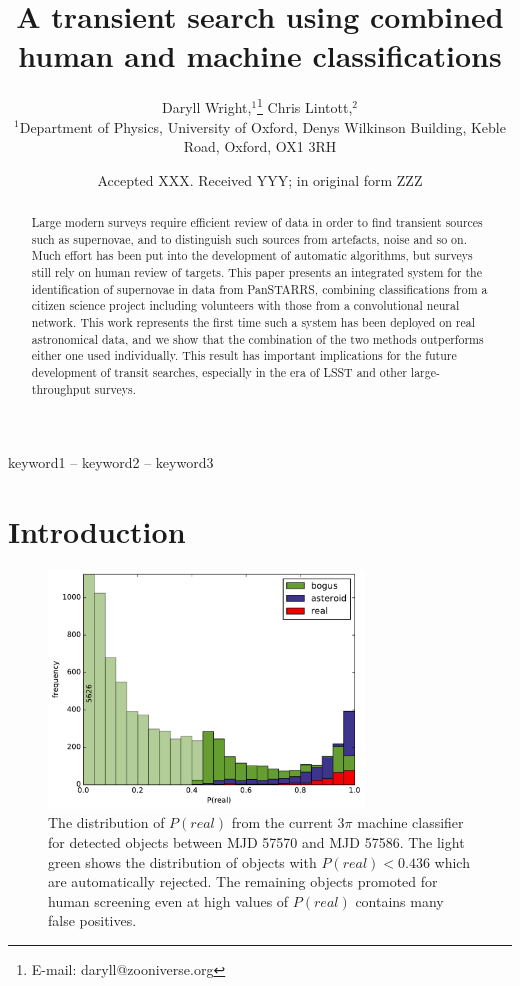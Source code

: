 \documentclass[a4paper,fleqn,usenatbib]{mnras}
\title[Human and machine classifications]{A transient search using combined human and machine classifications}
\author[D. Wright, C. Lintott et al.]{
Daryll Wright,$^{1}$\thanks{E-mail: daryll@zooniverse.org}
Chris Lintott,$^{2}$

$^{1}$Department of Physics, University of Oxford, Denys Wilkinson Building, Keble Road, Oxford, OX1 3RH
}
\date{Accepted XXX. Received YYY; in original form ZZZ}
\begin{document}
\label{firstpage}
\pagerange{\pageref{firstpage}--\pageref{lastpage}}
\maketitle

\begin{abstract}
Large modern surveys require efficient review of data in order to find transient sources such as supernovae, and to distinguish such sources from artefacts, noise and so on. Much effort has been put into the development of automatic algorithms, but surveys still rely on human review of targets. This paper presents an integrated system for the identification of supernovae in data from PanSTARRS, combining classifications from a citizen science project including volunteers with those from a convolutional neural network. This work represents the first time such a system has been deployed on real astronomical data, and we show that the combination of the two methods outperforms either one used individually. This result has important implications for the future development of transit searches, especially in the era of LSST and other large-throughput surveys. 
\end{abstract}

\begin{keywords}
keyword1 -- keyword2 -- keyword3
\end{keywords}



\section{Introduction}


\begin{figure}
   \includegraphics[width=84mm]{figs/machine_hist.pdf}
   \caption{The distribution of $P(real)$ from the current 3$\pi$ machine classifier 
            for detected objects between MJD 57570 and MJD 57586.  The light green shows the distribution of 
            objects with $P(real) < 0.436$ which are automatically rejected.  The remaining 
            objects promoted for human screening even at high values of $P(real)$ contains
            many false positives.} 
   \label{fig:machine_dist} 
\end{figure}
\end{document}
